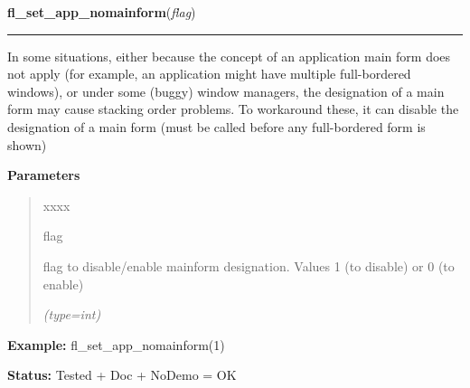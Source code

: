 \hspace{.8\funcindent}\begin{boxedminipage}{\funcwidth}

    \raggedright \textbf{fl\_set\_app\_nomainform}(\textit{flag})

    \vspace{-1.5ex}

    \rule{\textwidth}{0.5\fboxrule}
\setlength{\parskip}{2ex}
    In some situations, either because the concept of an application main 
    form does not apply (for example, an application might have multiple 
    full-bordered windows), or under some (buggy) window managers, the 
    designation of a main form may cause stacking order problems. To 
    workaround these, it can disable the designation of a main form (must 
    be called before any full-bordered form is shown)

\setlength{\parskip}{1ex}
      \textbf{Parameters}
      \vspace{-1ex}

      \begin{quote}
        \begin{Ventry}{xxxx}

          \item[flag]

          flag to disable/enable mainform designation. Values 1 (to 
          disable) or 0 (to enable)

            {\it (type=int)}

        \end{Ventry}

      \end{quote}

\textbf{Example:} fl\_set\_app\_nomainform(1)



\textbf{Status:} Tested + Doc + NoDemo = OK



    \end{boxedminipage}

    \label{xformslib:flbasic:fl_set_form_callback}

    \vspace{0.5ex}

